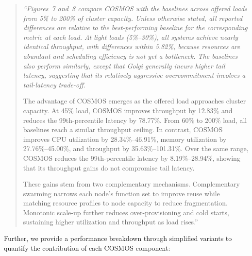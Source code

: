 \documentclass[11pt]{article}
\newenvironment{revisionquote}{\begin{quote}\itshape}{\end{quote}}
\begin{document}
\begin{revisionquote}
``Figures~7 and~8 compare COSMOS with the baselines across offered loads from 5\% to 200\% of cluster capacity. Unless otherwise stated, all reported differences are relative to the best-performing baseline for the corresponding metric at each load. At light loads (5\%--30\%), all systems achieve nearly identical throughput, with differences within 5.82\%, because resources are abundant and scheduling efficiency is not yet a bottleneck. The baselines also perform similarly, except that Golgi generally incurs higher tail latency, suggesting that its relatively aggressive overcommitment involves a tail-latency trade-off.

The advantage of COSMOS emerges as the offered load approaches cluster capacity. At 45\% load, COSMOS improves throughput by 12.83\% and reduces the 99th-percentile latency by 78.77\%. From 60\% to 200\% load, all baselines reach a similar throughput ceiling. In contrast, COSMOS improves CPU utilization by 28.34\%--46.91\%, memory utilization by 27.76\%--45.00\%, and throughput by 35.63\%--101.31\%. Over the same range, COSMOS reduces the 99th-percentile latency by 8.19\%--28.94\%, showing that its throughput gains do not compromise tail latency.

These gains stem from two complementary mechanisms. Complementary swarming narrows each node's function set to improve reuse while matching resource profiles to node capacity to reduce fragmentation. Monotonic scale-up further reduces over-provisioning and cold starts, sustaining higher utilization and throughput as load rises.''
\end{revisionquote}

Further, we provide a performance breakdown through simplified variants to quantify the contribution of each COSMOS component:
\end{document}
